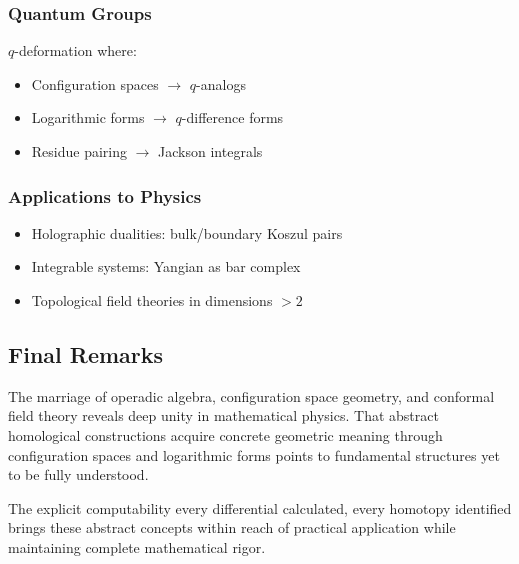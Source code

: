 \subsubsection{Quantum Groups}
$q$-deformation where:
\begin{itemize}
\item Configuration spaces $\to$ $q$-analogs
\item Logarithmic forms $\to$ $q$-difference forms
\item Residue pairing $\to$ Jackson integrals
\end{itemize}
 
\subsubsection{Applications to Physics}
\begin{itemize}
\item Holographic dualities: bulk/boundary Koszul pairs
\item Integrable systems: Yangian as bar complex
\item Topological field theories in dimensions $> 2$
\end{itemize}
 

\subsection{Final Remarks}
 
The marriage of operadic algebra, configuration space geometry, and conformal field theory reveals deep unity in mathematical physics. That abstract homological constructions acquire concrete geometric meaning through configuration spaces and logarithmic forms points to fundamental structures yet to be fully understood.
 
The explicit computability every differential calculated, every homotopy identified brings these abstract concepts within reach of practical application while maintaining complete mathematical rigor.
